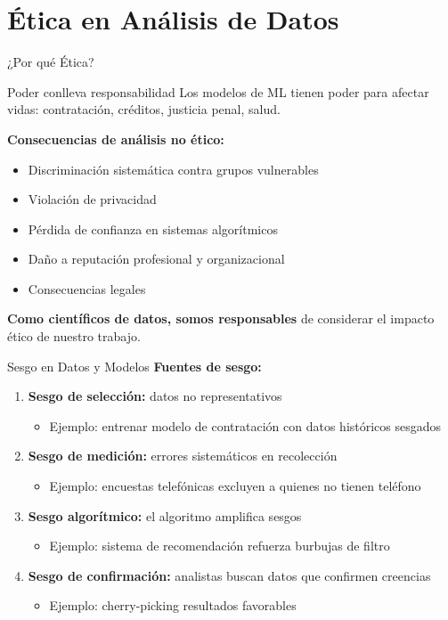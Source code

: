 \documentclass[aspectratio=169]{beamer}
\begin{document}
\section{Ética en Análisis de Datos}

\begin{frame}{¿Por qué Ética?}
\begin{block}{Poder conlleva responsabilidad}
Los modelos de ML tienen poder para afectar vidas: contratación, créditos, justicia penal, salud.
\end{block}

\vspace{0.3cm}

\textbf{Consecuencias de análisis no ético:}
\begin{itemize}
\item Discriminación sistemática contra grupos vulnerables
\item Violación de privacidad
\item Pérdida de confianza en sistemas algorítmicos
\item Daño a reputación profesional y organizacional
\item Consecuencias legales
\end{itemize}

\vspace{0.3cm}

\textbf{Como científicos de datos, somos responsables} de considerar el impacto ético de nuestro trabajo.
\end{frame}

\begin{frame}{Sesgo en Datos y Modelos}
\textbf{Fuentes de sesgo:}

\begin{enumerate}
\item \textbf{Sesgo de selección:} datos no representativos
\begin{itemize}
\item Ejemplo: entrenar modelo de contratación con datos históricos sesgados
\end{itemize}

\item \textbf{Sesgo de medición:} errores sistemáticos en recolección
\begin{itemize}
\item Ejemplo: encuestas telefónicas excluyen a quienes no tienen teléfono
\end{itemize}

\item \textbf{Sesgo algorítmico:} el algoritmo amplifica sesgos
\begin{itemize}
\item Ejemplo: sistema de recomendación refuerza burbujas de filtro
\end{itemize}

\item \textbf{Sesgo de confirmación:} analistas buscan datos que confirmen creencias
\begin{itemize}
\item Ejemplo: cherry-picking resultados favorables
\end{itemize}
\end{enumerate}
\end{frame}
\end{document}
